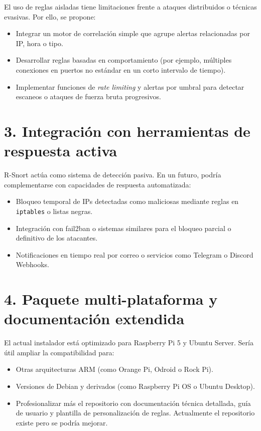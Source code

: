 \documentclass[11pt,a4paper,twoside]{report}
\begin{document}
El uso de reglas aisladas tiene limitaciones frente a ataques distribuidos o técnicas evasivas. Por ello, se propone:

\begin{itemize}
	\item Integrar un motor de correlación simple que agrupe alertas relacionadas por IP, hora o tipo.
	\item Desarrollar reglas basadas en comportamiento (por ejemplo, múltiples conexiones en puertos no estándar en un corto intervalo de tiempo).
	\item Implementar funciones de \textit{rate limiting} y alertas por umbral para detectar escaneos o ataques de fuerza bruta progresivos.
\end{itemize}

\section*{3. Integración con herramientas de respuesta activa}

R-Snort actúa como sistema de detección pasiva. En un futuro, podría complementarse con capacidades de respuesta automatizada:

\begin{itemize}
	\item Bloqueo temporal de IPs detectadas como maliciosas mediante reglas en \texttt{iptables} o listas negras.
	\item Integración con fail2ban o sistemas similares para el bloqueo parcial o definitivo de los atacantes.
	\item Notificaciones en tiempo real por correo o servicios como Telegram o Discord Webhooks.
\end{itemize}

\section*{4. Paquete multi-plataforma y documentación extendida}

El actual instalador está optimizado para Raspberry Pi 5 y Ubuntu Server. Sería útil ampliar la compatibilidad para:

\begin{itemize}
	\item Otras arquitecturas ARM (como Orange Pi, Odroid o Rock Pi).
	\item Versiones de Debian y derivados (como Raspberry Pi OS o Ubuntu Desktop).
	\item Profesionalizar más el repositorio con documentación técnica detallada, guía de usuario y plantilla de personalización de reglas. Actualmente el repositorio existe pero se podría mejorar.
\end{itemize}
\end{document}
